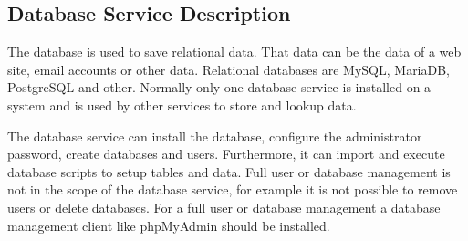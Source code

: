 \subsection{Database Service Description}

The database is used to save relational data. That data can be the data of a web site, email accounts or other data. Relational databases are MySQL, MariaDB, PostgreSQL and other. Normally only one database service is installed on a system and is used by other services to store and lookup data.

The database service can install the database, configure the administrator password, create databases and users. Furthermore, it can import and execute database scripts to setup tables and data. Full user or database management is not in the scope of the database service, for example it is not possible to remove users or delete databases. For a full user or database management a database management client like phpMyAdmin should be installed.
